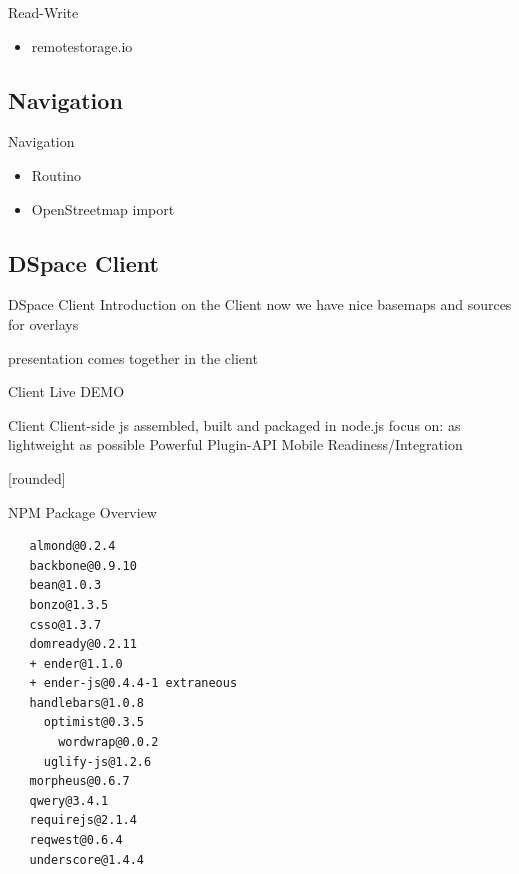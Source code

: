\documentclass{beamer}
\newcommand\Fontvi{\fontsize{6}{7.2}\selectfont}
\begin{document}
\begin{frame}{Read-Write}
 \begin{itemize}
  \item remotestorage.io
 \end{itemize}
\end{frame}


\subsection{Navigation}

\begin{frame}{Navigation}
 \begin{itemize}
  \item Routino
  \item OpenStreetmap import
 \end{itemize}
\end{frame}


\subsection{DSpace Client}

\begin{frame}{DSpace Client}
 Introduction on the Client
 now we have nice basemaps and sources for overlays

 presentation comes together in the client
\end{frame}


\begin{frame}{Client}
Live DEMO
\end{frame}

\begin{frame}{Client}
Client-side js
assembled, built and packaged in node.js
focus on: as lightweight as possible
Powerful Plugin-API
Mobile Readiness/Integration
\end{frame}



[rounded]
\begin{frame}[fragile]{NPM Package Overview}
\Fontvi
{}
\begin{block}{}
\begin{lstlisting}
   almond@0.2.4
   backbone@0.9.10
   bean@1.0.3
   bonzo@1.3.5
   csso@1.3.7
   domready@0.2.11
   + ender@1.1.0
   + ender-js@0.4.4-1 extraneous
   handlebars@1.0.8
     optimist@0.3.5
       wordwrap@0.0.2
     uglify-js@1.2.6
   morpheus@0.6.7
   qwery@3.4.1
   requirejs@2.1.4
   reqwest@0.6.4
   underscore@1.4.4
\end{lstlisting}
\end{block}
\end{frame}
\end{document}
